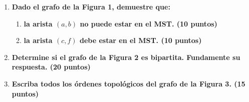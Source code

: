 \documentclass[a4paper,12pt]{article} %
\begin{document}
\begin{enumerate}
    
    \item \textbf{Dado el grafo de la Figura 1, demuestre que:}
    \begin{enumerate}
        \item \textbf{la arista $(a,b)$ no puede estar en el MST. (\textbf{10 puntos})}
        
        \item \textbf{la arista $(c,f)$ debe estar en el MST. (\textbf{10 puntos})}
    \end{enumerate}
    
    
    \item \textbf{Determine si el grafo de la Figura 2 es bipartita. Fundamente su respuesta. (\textbf{20 puntos})}


    \item \textbf{Escriba todos los órdenes topológicos del grafo de la Figura 3. (\textbf{15 puntos})}

    
\end{enumerate}
\end{document}
